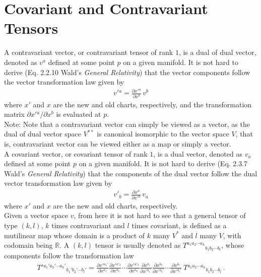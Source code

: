 \documentclass[11pt, onesided]{book}
\theoremstyle{break}
\theoremstyle{break}
\newcommand{\R}{\mathbb{R}}
\newcommand{\pd}{\partial}
\newcommand{\txt}{Wald's \textit{General Relativity}}
\newcommand{\note}{\color{red}Note: \color{black}}
\begin{document}
\section[Covariant and Contravariant Tensors]{\color{red}Covariant and Contravariant Tensors\color{black}}
A contravariant vector, or contravariant tensor of rank $1$, is a dual of dual vector, denoted as $v^a$ defined at some point $p$ on a given manifold. It is not hard to derive (Eq. 2.2.10 \txt) that the vector components follow the vector transformation law given by
\begin{align*}
v'{}^a = \frac{\pd x'{}^a}{\pd x^b}\, v^b
\end{align*}
where $x'$ and $x$ are the new and old charts, respectively, and the transformation matrix ${\pd x'{}^a}/\pd x^b$ is evaluated at $p$.\\

\note Note that a contravariant vector can simply be viewed as a vector, as the dual of dual vector space $V^{**}$ is canonical isomorphic to the vector space $V$, that is, contravariant vector can be viewed either as a map or simply a vector.\\

A covariant vector, or covariant tensor of rank $1$, is a dual vector, denoted as $v_a$ defined at some point $p$ on a given manifold.  It is not hard to derive (Eq. 2.3.7 \txt) that the components of the dual vector follow the dual vector transformation law given by
\begin{align*}
v'{}_b = \frac{\pd x{}^a}{\pd x'{}^b}\, v_a
\end{align*}
where $x'$ and $x$ are the new and old charts, respectively. \\

Given a vector space $v$, from here it is not hard to see that a general tensor of type $(k,l)$, $k$ times contravariant and $l$ times covariant, is defined as a mutilinear map whose domain is a product of $k$ many $V^*$ and $l$ many $V$, with codomain being $\R$. A $(k,l)$ tensor is usually denoted as $T^{a_1a_2\cdots a_k}{}_{b_1b_2\cdots b_l}$, whose components follow the transformation law
\begin{align}
T'{}^{a_1'a_2'\cdots a_k'}{}_{b_1'b_2'\cdots b_l'} = \frac{\pd x'{}^{a_1'}}{\pd x^{a_1}}\frac{\pd x'{}^{a'_2}}{\pd x^{a_2}}\cdots \frac{\pd x'{}^{a'_k}}{\pd x^{a_k}}\frac{\pd x^{b_1}}{\pd x'{}^{b_1'}}
\frac{\pd x^{b_2}}{\pd x'{}^{b_2'}}\cdots \frac{\pd x^{b_l}}{\pd x'{}^{b_l'}}\ T{}^{a_1a_2\cdots a_k}{}_{b_1b_2\cdots b_l}\,. 
\end{align}
\end{document}

